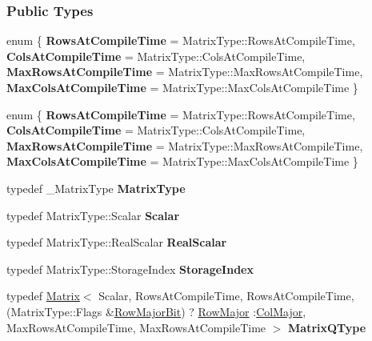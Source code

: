 \subsubsection*{Public Types}
\begin{DoxyCompactItemize}
\item 
\mbox{\label{group___q_r___module_a2478269da85dc52fc65bc2675976a8e6}} 
enum \{ {\bfseries Rows\+At\+Compile\+Time} = Matrix\+Type\+:\+:Rows\+At\+Compile\+Time, 
{\bfseries Cols\+At\+Compile\+Time} = Matrix\+Type\+:\+:Cols\+At\+Compile\+Time, 
{\bfseries Max\+Rows\+At\+Compile\+Time} = Matrix\+Type\+:\+:Max\+Rows\+At\+Compile\+Time, 
{\bfseries Max\+Cols\+At\+Compile\+Time} = Matrix\+Type\+:\+:Max\+Cols\+At\+Compile\+Time
 \}
\item 
\mbox{\label{group___q_r___module_a8740631d269194f5ded79496e2f75c61}} 
enum \{ {\bfseries Rows\+At\+Compile\+Time} = Matrix\+Type\+:\+:Rows\+At\+Compile\+Time, 
{\bfseries Cols\+At\+Compile\+Time} = Matrix\+Type\+:\+:Cols\+At\+Compile\+Time, 
{\bfseries Max\+Rows\+At\+Compile\+Time} = Matrix\+Type\+:\+:Max\+Rows\+At\+Compile\+Time, 
{\bfseries Max\+Cols\+At\+Compile\+Time} = Matrix\+Type\+:\+:Max\+Cols\+At\+Compile\+Time
 \}
\item 
\mbox{\label{group___q_r___module_a134120663d098b19d0850c8b8277f0bf}} 
typedef \+\_\+\+Matrix\+Type {\bfseries Matrix\+Type}
\item 
\mbox{\label{group___q_r___module_a5dce09a1ce29ead94f3eae883ee2eaa0}} 
typedef Matrix\+Type\+::\+Scalar {\bfseries Scalar}
\item 
\mbox{\label{group___q_r___module_a153982d3df67aedc48bfe046d6677a69}} 
typedef Matrix\+Type\+::\+Real\+Scalar {\bfseries Real\+Scalar}
\item 
\mbox{\label{group___q_r___module_a099bd13f10d30af75c88657096870343}} 
typedef Matrix\+Type\+::\+Storage\+Index {\bfseries Storage\+Index}
\item 
\mbox{\label{group___q_r___module_a6f384954ee6154168ee979d23f43930a}} 
typedef \hyperlink{group___core___module_class_eigen_1_1_matrix}{Matrix}$<$ Scalar, Rows\+At\+Compile\+Time, Rows\+At\+Compile\+Time,(Matrix\+Type\+::\+Flags \&\hyperlink{group__flags_gae4f56c2a60bbe4bd2e44c5b19cbe8762}{Row\+Major\+Bit}) ? \hyperlink{group__enums_ggaacded1a18ae58b0f554751f6cdf9eb13acfcde9cd8677c5f7caf6bd603666aae3}{Row\+Major} \+:\hyperlink{group__enums_ggaacded1a18ae58b0f554751f6cdf9eb13a0cbd4bdd0abcfc0224c5fcb5e4f6669a}{Col\+Major}, Max\+Rows\+At\+Compile\+Time, Max\+Rows\+At\+Compile\+Time $>$ {\bfseries Matrix\+Q\+Type}

\end{DoxyCompactItemize}
